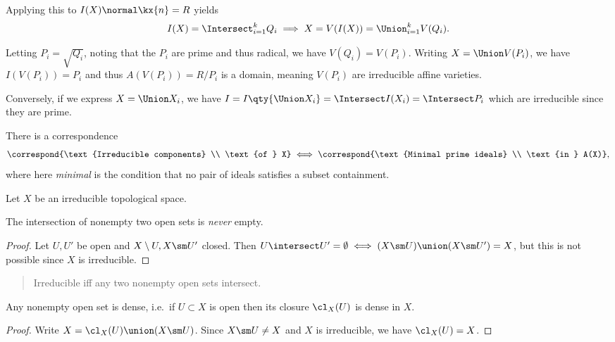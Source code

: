 Applying this to \(I(X) \normal \kx{n} = R\) yields
\begin{align*}  
I(X) = \Intersect_{i=1}^k Q_i 
\implies
X  = V(I(X)) = \Union_{i=1}^k V(Q_i)
.\end{align*}

Letting \(P_i = \sqrt{Q_i}\), noting that the \(P_i\) are prime and thus
radical, we have \(V(Q_i) = V(P_i)\). Writing \(X = \Union V(P_i)\), we
have \(I(V(P_i)) = P_i\) and thus \(A(V(P_i)) = R/P_i\) is a domain,
meaning \(V(P_i)\) are irreducible affine varieties.

Conversely, if we express \(X = \Union X_i\), we have
\(I = I\qty{\Union X_i} = \Intersect I(X_i) = \Intersect P_i\) which are
irreducible since they are prime.

\begin{remark}

There is a correspondence
\begin{align*}  
\correspond{\text{Irreducible components} \\ \text{of } X} 
\iff
\correspond{\text{Minimal prime ideals} \\ \text{in } A(X)}
,\end{align*} where here \emph{minimal} is the condition that no pair of
ideals satisfies a subset containment.

\end{remark}

\begin{remark}

Let \(X\) be an irreducible topological space.

\begin{proposition}[1]

The intersection of nonempty two open sets is \emph{never} empty.

\end{proposition}

\begin{proof}

Let \(U, U'\) be open and \(X\setminus U, X\sm U'\) closed. Then
\(U\intersect U' = \emptyset \iff (X\sm U) \union (X\sm U') = X\), but
this is not possible since \(X\) is irreducible.

\end{proof}

\begin{quote}
Irreducible iff any two nonempty open sets intersect.
\end{quote}

\begin{proposition}[?]

Any nonempty open set is dense, i.e.~if \(U\subset X\) is open then its
closure \(\cl_X(U)\) is dense in \(X\).

\end{proposition}

\begin{proof}

Write \(X = \cl_X(U) \union (X\sm U)\). Since \(X\sm U \neq X\) and
\(X\) is irreducible, we have \(\cl_X(U) = X\).

\end{proof}

\end{remark}

